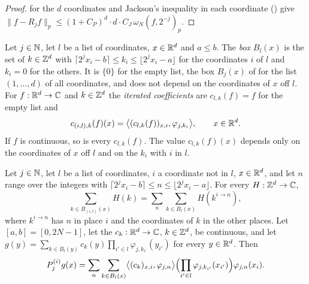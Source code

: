 \begin{proof}
\leanok
{}
 for the $d$ coordinates and Jackson's inequality in each coordinate
() give
$\|f - R_j f\|_p \leq (1 + C_P)^d \cdot d \cdot C_J \, \omega_N(f, 2^{-j})_p$.
\end{proof}

\begin{definition}
\label{def:daub-rd-fold-coeff}
\leanok
{}
Let $j \in \mathbb{N}$, let $l$ be a list of coordinates, $x \in \mathbb{R}^d$ and $a \leq b$. The \emph{box}
$B_l(x)$ is the set of $k \in \mathbb{Z}^d$ with
$\lceil 2^j x_i - b \rceil \leq k_i \leq \lfloor 2^j x_i - a \rfloor$ for the coordinates $i$ of
$l$ and $k_i = 0$ for the others. It is $\{0\}$ for the empty list, the box $B_j(x)$ of
 for the list $(1, \dots, d)$ of all coordinates, and does not depend
on the coordinates of $x$ off $l$. For $f : \mathbb{R}^d \to \mathbb{C}$ and $k \in \mathbb{Z}^d$ the \emph{iterated
coefficients} are $c_{l,k}(f) = f$ for the empty list and
\[
  c_{(i,l),k}(f)(x) = \bigl\langle (c_{l,k}(f))_{x,i}, \varphi_{j,k_i} \bigr\rangle ,
  \qquad x \in \mathbb{R}^d .
\]
If $f$ is continuous, so is every $c_{l,k}(f)$. The value $c_{l,k}(f)(x)$ depends only on the
coordinates of $x$ off $l$ and on the $k_i$ with $i$ in $l$.
\end{definition}

\begin{lemma}
\label{lem:daub-rd-one-more-coordinate}
\leanok
{}
Let $j \in \mathbb{N}$, let $l$ be a list of coordinates, $i$ a coordinate not in $l$, $x \in \mathbb{R}^d$, and
let $n$ range over the integers with
$\lceil 2^j x_i - b \rceil \leq n \leq \lfloor 2^j x_i - a \rfloor$. For every $H : \mathbb{Z}^d \to \mathbb{C}$,
\[
  \sum_{k \in B_{(i,l)}(x)} H(k) = \sum_n \sum_{k \in B_l(x)} H(k^{i \to n}) ,
\]
where $k^{i \to n}$ has $n$ in place $i$ and the coordinates of $k$ in the other places. Let
$[a, b] = [0, 2N - 1]$, let the $c_k : \mathbb{R}^d \to \mathbb{C}$, $k \in \mathbb{Z}^d$, be continuous, and let
$g(y) = \sum_{k \in B_l(y)} c_k(y) \prod_{i' \in l} \varphi_{j,k_{i'}}(y_{i'})$ for every
$y \in \mathbb{R}^d$. Then
\[
  P^{(i)}_j g(x) = \sum_n \sum_{k \in B_l(x)} \bigl\langle (c_k)_{x,i}, \varphi_{j,n} \bigr\rangle
    \Bigl(\prod_{i' \in l} \varphi_{j,k_{i'}}(x_{i'})\Bigr) \varphi_{j,n}(x_i) .
\]
\end{lemma}

